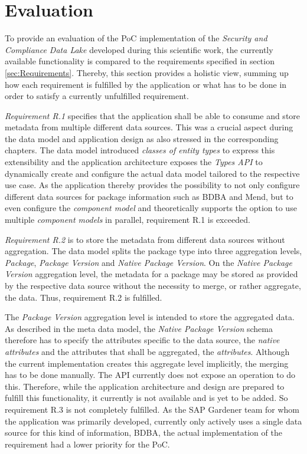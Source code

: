 \section{Evaluation}
To provide an evaluation of the PoC implementation of the \emph{Security and Compliance Data Lake} developed during this scientific work, the currently available functionality is compared to the requirements specified in section \ref{sec:Requirements}. Thereby, this section provides a holistic view, summing up how each requirement is fulfilled by the application or what has to be done in order to satisfy a currently unfulfilled requirement.\par
\emph{Requirement R.1} specifies that the application shall be able to consume and store metadata from multiple different data sources. This was a crucial aspect during the data model and application design as also stressed in the corresponding chapters. The data model introduced \emph{classes of entity types} to express this extensibility and the application architecture exposes the \emph{Types API} to dynamically create and configure the actual data model tailored to the respective use case. As the application thereby provides the possibility to not only configure different data sources for package information such as BDBA and Mend, but to even configure the \emph{component model} and theoretically supports the option to use multiple \emph{component models} in parallel, requirement R.1 is exceeded.\par
\emph{Requirement R.2} is to store the metadata from different data sources without aggregation. The data model splits the package type into three aggregation levels, \emph{Package}, \emph{Package Version} and \emph{Native Package Version}. On the \emph{Native Package Version} aggregation level, the metadata for a package may be stored as provided by the respective data source without the necessity to merge, or rather aggregate, the data. Thus, requirement R.2 is fulfilled.\par
The \emph{Package Version} aggregation level is intended to store the aggregated data. As described in the meta data model, the \emph{Native Package Version} schema therefore has to specify the attributes specific to the data source, the \emph{native attributes} and the attributes that shall be aggregated, the \emph{attributes}. Although the current implementation creates this aggregate level implicitly, the merging has to be done manually. The API currently does not expose an operation to do this. Therefore, while the application architecture and design are prepared to fulfill this functionality, it currently is not available and is yet to be added. So requirement R.3 is not completely fulfilled. As the SAP Gardener team for whom the application was primarily developed, currently only actively uses a single data source for this kind of information, BDBA, the actual implementation of the requirement had a lower priority for the PoC.\par
